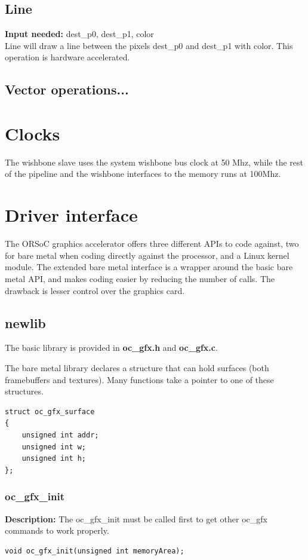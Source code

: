 \documentclass[10pt,a4paper]{article}
\begin{document}
\subsection{Line}
\textbf{Input needed:} dest\_p0, dest\_p1, color\\
Line will draw a line between the pixels dest\_p0 and dest\_p1 with color. This operation is hardware accelerated.

\subsection{Vector operations...}

\section{Clocks}
The wishbone slave uses the system wishbone bus clock at 50 Mhz, while the rest of the pipeline and the wishbone interfaces to the memory runs at 100Mhz.

\section{Driver interface}
The ORSoC graphics accelerator offers three different APIs to code against, two for bare metal when coding directly against the processor, and a Linux kernel module. The extended bare metal interface is a wrapper around the basic bare metal API, and makes coding easier by reducing the number of calls. The drawback is lesser control over the graphics card.

\subsection{newlib}
The basic library is provided in \textbf{oc\_gfx.h} and \textbf{oc\_gfx.c}.

The bare metal library declares a structure that can hold surfaces (both framebuffers and textures). Many functions take a pointer to one of these structures.
\begin{lstlisting}
struct oc_gfx_surface
{
	unsigned int addr;
	unsigned int w;
	unsigned int h;
};
\end{lstlisting}

\subsubsection{oc\_gfx\_init}
\textbf{Description:} The oc\_gfx\_init must be called first to get other oc\_gfx commands to work properly.
\begin{lstlisting}
void oc_gfx_init(unsigned int memoryArea);
\end{lstlisting}
\end{document}
